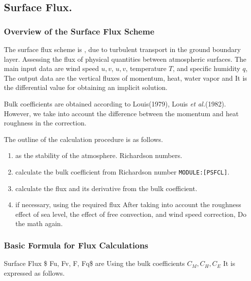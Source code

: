 \hypertarget{surface-flux.}{%
\subsection{Surface Flux.}\label{surface-flux.}}

\hypertarget{overview-of-the-surface-flux-scheme}{%
\subsubsection{Overview of the Surface Flux
Scheme}\label{overview-of-the-surface-flux-scheme}}

The surface flux scheme is , due to turbulent transport in the ground
boundary layer. Assessing the flux of physical quantities between
atmospheric surfaces. The main input data are wind speed \(u, v\),
\(u, v\), temperature \(T\), and specific humidity \(q\), The output
data are the vertical fluxes of momentum, heat, water vapor and It is
the differential value for obtaining an implicit solution.

Bulk coefficients are obtained according to Louis(1979), Louis {\emph{et
al.}}(1982). However, we take into account the difference between the
momentum and heat roughness in the correction.

The outline of the calculation procedure is as follows.

\begin{enumerate}
\def\labelenumi{\arabic{enumi}.}
\item
  as the stability of the atmosphere. Richardson numbers.
\item
  calculate the bulk coefficient from Richardson number
  \texttt{MODULE:{[}PSFCL{]}}.
\item
  calculate the flux and its derivative from the bulk coefficient.
\item
  if necessary, using the required flux After taking into account the
  roughness effect of sea level, the effect of free convection, and wind
  speed correction, Do the math again.
\end{enumerate}

\hypertarget{basic-formula-for-flux-calculations}{%
\subsubsection{Basic Formula for Flux
Calculations}\label{basic-formula-for-flux-calculations}}

Surface Flux \$ Fu, Fv, F\theta, Fq\$ are Using the bulk coefficients
\(C_M, C_H, C_E\) It is expressed as follows.

